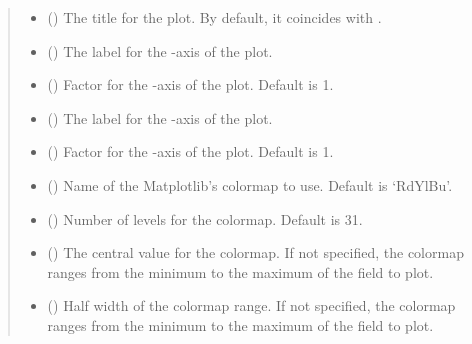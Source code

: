 \documentclass[letterpaper,10pt,english]{sphinxmanual}
\begin{document}
\begin{fulllineitems}
\begin{fulllineitems}
\begin{quote}
\begin{description}
\begin{itemize}
\item {} 
 () \textendash{} The title for the plot. By default, it coincides with .

\item {} 
 () \textendash{} The label for the -axis of the plot.

\item {} 
 () \textendash{} Factor for the -axis of the plot. Default is 1.

\item {} 
 () \textendash{} The label for the -axis of the plot.

\item {} 
 () \textendash{} Factor for the -axis of the plot. Default is 1.

\item {} 
 () \textendash{} Name of the Matplotlib’s colormap to use. Default is ‘RdYlBu’.

\item {} 
 () \textendash{} Number of levels for the colormap. Default is 31.

\item {} 
 () \textendash{} The central value for the colormap. If not specified, the colormap ranges from the minimum to the maximum
of the field to plot.

\item {} 
 () \textendash{} Half width of the colormap range. If not specified, the colormap ranges from the minimum to the maximum
of the field to plot.

\end{itemize}

\end{description}\end{quote}

\end{fulllineitems}


\end{fulllineitems}
\end{document}

